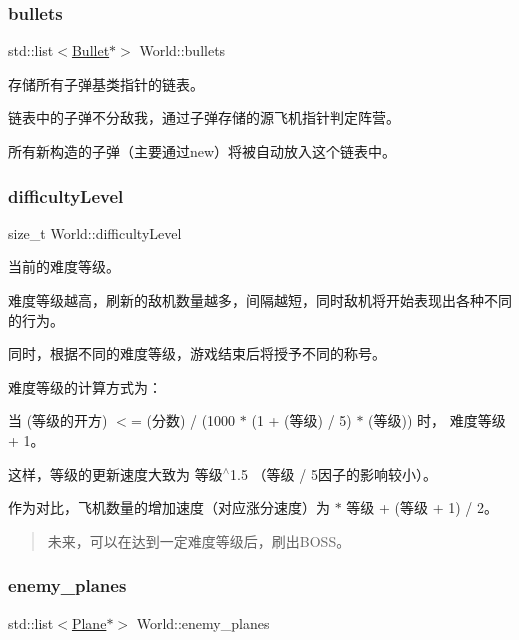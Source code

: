 \subsubsection{\texorpdfstring{bullets}{bullets}}
{\footnotesize\ttfamily std\+::list$<$\hyperlink{class_bullet}{Bullet}$\ast$$>$ World\+::bullets}



存储所有子弹基类指针的链表。 

链表中的子弹不分敌我，通过子弹存储的源飞机指针判定阵营。

所有新构造的子弹（主要通过new）将被自动放入这个链表中。 \mbox{\label{class_world_a594e81a86f319eea4e8e5a2029cdaa90}} 
\subsubsection{\texorpdfstring{difficulty\+Level}{difficultyLevel}}
{\footnotesize\ttfamily size\+\_\+t World\+::difficulty\+Level}



当前的难度等级。 

难度等级越高，刷新的敌机数量越多，间隔越短，同时敌机将开始表现出各种不同的行为。

同时，根据不同的难度等级，游戏结束后将授予不同的称号。

难度等级的计算方式为：
\begin{DoxyItemize}
\item 当 {\ttfamily (等级的开方) $<$= (分数) / (1000 $\ast$ (1 + (等级) / 5) $\ast$ (等级))} 时， 难度等级 + 1。
\item 这样，等级的更新速度大致为 {\ttfamily 等级$^\wedge$1.5} （{\ttfamily 等级 / 5}因子的影响较小）。
\item 作为对比，飞机数量的增加速度（对应涨分速度）为 { $\ast$ 等级 + (等级 + 1) / 2}。
\end{DoxyItemize}

\begin{quote}
未来，可以在达到一定难度等级后，刷出\+B\+O\+S\+S。 \end{quote}
\mbox{\label{class_world_a9692ac6798300e7fde98eb3ef1bb7c79}} 
\subsubsection{\texorpdfstring{enemy\+\_\+planes}{enemy\_planes}}
{\footnotesize\ttfamily std\+::list$<$\hyperlink{class_plane}{Plane}$\ast$$>$ World\+::enemy\+\_\+planes}



